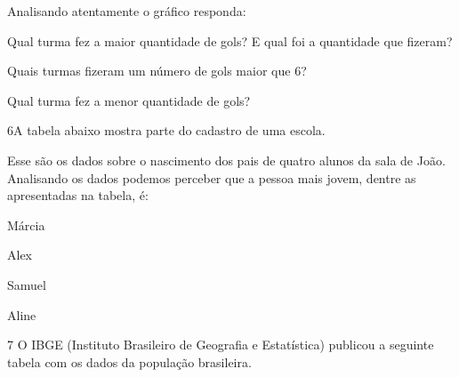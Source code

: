 Analisando atentamente o gráfico responda:

\begin{escolha}
\item
  Qual turma fez a maior quantidade de gols? E qual foi a quantidade que
  fizeram?


\item
  Quais turmas fizeram um número de gols maior que 6?


\item
  Qual turma fez a menor quantidade de gols?

\end{escolha}


\num{6}A tabela abaixo mostra parte do cadastro de uma escola.


Esse são os dados sobre o nascimento dos pais de quatro alunos da sala
de João. Analisando os dados podemos perceber que a pessoa mais jovem,
dentre as apresentadas na tabela, é:

\begin{escolha}
\item
  Márcia
\item
  Alex
\item
  Samuel
\item
  Aline
\end{escolha}


\num{7} O IBGE (Instituto Brasileiro de Geografia e Estatística) publicou a
seguinte tabela com os dados da população brasileira.



